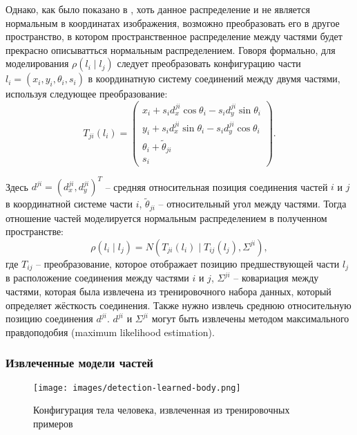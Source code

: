 Однако, как было показано в \cite{felzenszwalb05}, хоть данное распределение и не является нормальным в координатах изображения, возможно преобразовать его в другое пространство, в котором пространственное распределение между частями будет прекрасно описыватться нормальным распределением. Говоря формально, для моделирования \(\rho(l_i{\mid}l_j)\) следует преобразовать конфигурацию части \(l_i = (x_i, y_i, \theta_i, s_i)\) в координатную систему соединений между двумя частями, используя следующее преобразование:
\begin{equation}
  T_{ji}(l_i) =
  \begin{pmatrix}
    x_i + s_id_x^{ji}\cos{\theta_i} - s_id_y^{ji}\sin{\theta_i}\\
    y_i + s_id_x^{ji}\sin{\theta_i} - s_id_y^{ji}\cos{\theta_i}\\
    \theta_i + \tilde{\theta}_{ji}\\
    s_i
  \end{pmatrix}.
\end{equation}

Здесь \(d^{ji} = (d_x^{ji}, d_y^{ji})^T\) -- средняя относительная позиция соединения частей \(i\) и \(j\) в координатной системе части \(i\), \(\tilde{\theta}_{ji}\) -- относительный угол между частями. Тогда отношение частей моделируется нормальным распределением в полученном пространстве:
\begin{equation}
  \rho(l_i{\mid}l_j) = N(T_{ji}(l_i){\mid}T_{ij}(l_j), \Sigma^{ji}),
\end{equation}
где \(T_{ij}\) -- преобразование, которое отображает позицию предшествующей части \(l_j\) в расположение соединения между частями \(i\) и \(j\), \(\Sigma^{ji}\) -- ковариация между частями, которая была извлечена из тренировочного набора данных, который определяет жёсткость соединения. Также нужно извлечь среднюю относительную позицию соединения \(d^{ji}\). \(d^{ji}\) и \(\Sigma^{ji}\) могут быть извлечены методом максимального правдоподобия (maximum likelihood estimation).

\subsubsection{Извлеченные модели частей}

\begin{figure}
  \centering
  \texttt{[image: images/detection-learned-body.png]}
  \caption{Конфигурация тела человека, извлеченная из тренировочных примеров\label{detection-learned-body}}
\end{figure}

